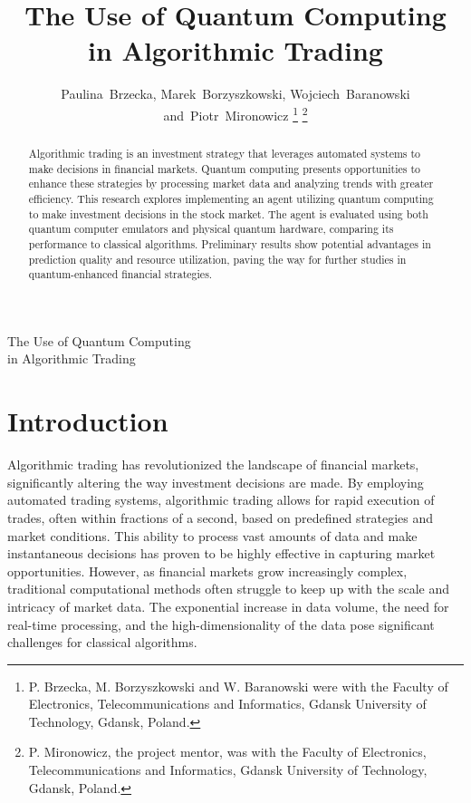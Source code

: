 \documentclass[journal]{IEEEtran}
\begin{document}
\title{The Use of Quantum Computing\\ in Algorithmic Trading}

\author{Paulina~Brzecka,
        Marek~Borzyszkowski,
        Wojciech~Baranowski
        and~Piotr~Mironowicz%
\thanks{P. Brzecka, M. Borzyszkowski and W. Baranowski were with the Faculty 
of Electronics, Telecommunications and Informatics, Gdansk University of Technology, Gdansk,
Poland.}%
\thanks{P. Mironowicz, the project mentor, was with the Faculty 
of Electronics, Telecommunications and Informatics, Gdansk University of Technology, Gdansk,
Poland.}
}

%
{The Use of Quantum Computing\\ in Algorithmic Trading}

\maketitle

\begin{abstract}
Algorithmic trading is an investment strategy that leverages automated systems to make decisions in financial markets. Quantum computing presents opportunities to enhance these strategies by processing market data and analyzing trends with greater efficiency. This research explores implementing an agent utilizing quantum computing to make investment decisions in the stock market. The agent is evaluated using both quantum computer emulators and physical quantum hardware, comparing its performance to classical algorithms. Preliminary results show potential advantages in prediction quality and resource utilization, paving the way for further studies in quantum-enhanced financial strategies.
\end{abstract}

\section{Introduction}
Algorithmic trading has revolutionized the landscape of financial markets, significantly altering the way investment decisions are made. By employing automated trading systems, algorithmic trading allows for rapid execution of trades, often within fractions of a second, based on predefined strategies and market conditions. This ability to process vast amounts of data and make instantaneous decisions has proven to be highly effective in capturing market opportunities. However, as financial markets grow increasingly complex, traditional computational methods often struggle to keep up with the scale and intricacy of market data. The exponential increase in data volume, the need for real-time processing, and the high-dimensionality of the data pose significant challenges for classical algorithms.
\end{document}
